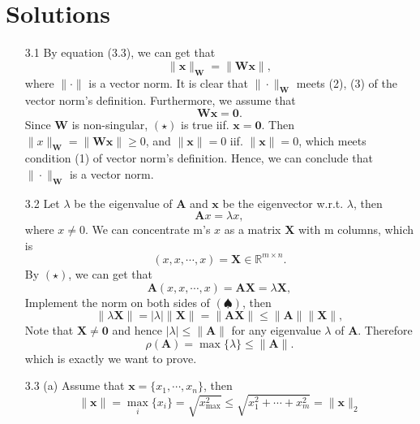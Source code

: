 \section{Solutions}
\begin{enumerate}
    \item[3.1] {
    By equation (3.3), we can get that
    $$
         \| \bm{x} \|_{\bm{W}} = \|\bm{Wx} \|,
    $$
    where $\| \cdot \|$ is a vector norm. It is clear that $\|\cdot \|_{\bm{W}}$ meets (2), (3) of the vector norm's definition. Furthermore, we assume that
    \begin{equation*}
    \bm{Wx} = \bm{0}.  \tag{$\star$}
    \end{equation*}
    }
    Since $\bm{W}$ is non-singular, $(\star)$ is true iif. $\bm{x} = \bm{0}$. Then $\| x\|_{\bm{W}} = \|\bm{Wx} \| \geq 0$, and $\| \bm{x} \|= 0 $ iif. $\| \bm{x} \| = 0$, which meets condition (1) of vector norm's definition. Hence, we can conclude that $\| \cdot \|_{\bm{W}}$ is a vector norm.

    \item[3.2] {
        Let $\lambda$ be the eigenvalue of $\bm{A}$ and $\bm{x}$ be the eigenvector w.r.t. $\lambda$, then
        \begin{equation*}
        \bm{A} x = \lambda x, \tag{$\star$}
        \end{equation*}
        where $x \neq 0$. We can concentrate m's $x$ as a matrix $\bm{X}$ with m columns, which is 
        $$
        (x, x, \cdots, x) = \bm{X} \in \mathbb{R}^{m \times n}.
        $$
        By $(\star)$, we can get that
        \begin{equation*}
            \bm{A} (x, x, \cdots, x)= \bm{A} \bm{X}=\lambda \bm{X}, \tag{$\spadesuit$}
        \end{equation*}
        Implement the norm on both sides of $(\spadesuit)$, then
        $$
        \| \lambda \bm{X} \| = | \lambda | \| \bm{X} \| = \| \bm{AX} \| \leq \| \bm{A} \| \|\bm{X} \|,
        $$
        Note that $\bm{X} \neq \bm{0}$ and hence $| \lambda | \leq \| \bm{A} \|$ for any eigenvalue $\lambda$ of $\bm{A}$. Therefore
        $$
        \rho(\bm{A}) = \max \{ \lambda \} \leq \| \bm{A} \|.
        $$
        which is exactly we want to prove.
    }
    
    \item[3.3 (a)] {
        Assume that $\bm{x} = \{x_1, \cdots, x_n \}$, then
        $$
        \| \bm{x}\| = \max_i \{x_i\} = \sqrt{x^2_{\max}} \leq \sqrt{x_1^2 + \cdots + x_m^2 } = \| \bm{x} \|_2
        $$
    }


\end{enumerate}
